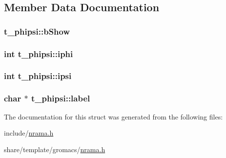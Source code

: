 \subsection{\-Member \-Data \-Documentation}
\hypertarget{structt__phipsi_a6e8e6d313fe5bb48f5d97d7421cccf25}{
\subsubsection[{b\-Show}]{ {\bf t\-\_\-phipsi\-::b\-Show}}}\label{structt__phipsi_a6e8e6d313fe5bb48f5d97d7421cccf25}
\hypertarget{structt__phipsi_af578d9e6ec8562ca4641081a5725a2a1}{
\subsubsection[{iphi}]{\setlength{\rightskip}{0pt plus 5cm}int {\bf t\-\_\-phipsi\-::iphi}}}\label{structt__phipsi_af578d9e6ec8562ca4641081a5725a2a1}
\hypertarget{structt__phipsi_a6dc10c18f3584b8c2d9fe17f33660561}{
\subsubsection[{ipsi}]{\setlength{\rightskip}{0pt plus 5cm}int {\bf t\-\_\-phipsi\-::ipsi}}}\label{structt__phipsi_a6dc10c18f3584b8c2d9fe17f33660561}
\hypertarget{structt__phipsi_adfc2df75e17781152e724f073805b036}{
\subsubsection[{label}]{\setlength{\rightskip}{0pt plus 5cm}char $\ast$ {\bf t\-\_\-phipsi\-::label}}}\label{structt__phipsi_adfc2df75e17781152e724f073805b036}


\-The documentation for this struct was generated from the following files\-:\begin{DoxyCompactItemize}
\item 
include/\hyperlink{include_2nrama_8h}{nrama.\-h}\item 
share/template/gromacs/\hyperlink{share_2template_2gromacs_2nrama_8h}{nrama.\-h}\end{DoxyCompactItemize}
